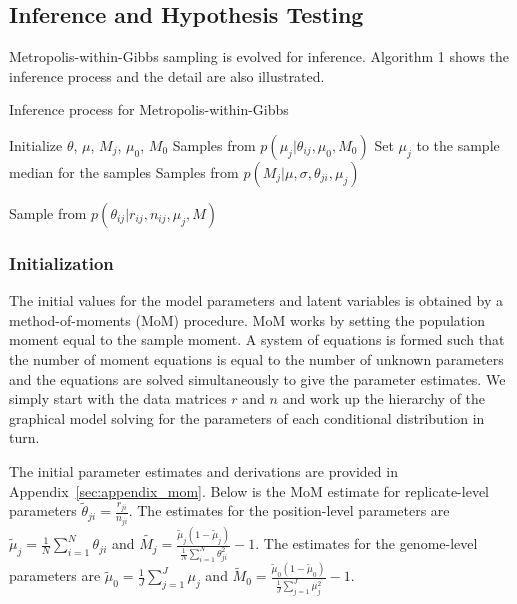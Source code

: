 \documentclass[11pt,reqno]{amsart}
\begin{document}
\subsection{Inference and Hypothesis Testing}

Metropolis-within-Gibbs sampling is evolved for inference. Algorithm 1 shows the inference process and the detail are also illustrated.

\begin{algorithm}[ht]
\caption{Inference process for Metropolis-within-Gibbs}
\label{alg:metro_gibbs}
\begin{algorithmic}[1]

\State Initialize $\theta$, $\mu$, $M_j$, $\mu_0$, $M_0$
\Repeat
{}
  \State Samples from $p \left( \mu_j |\theta_{ij},\mu_0,M_0\right)$ 
  \State Set $\mu_j$ to the sample median for the samples
  \State Samples from $p \left( M_{j} |\mu,\sigma, \theta_{ji},\mu_j\right)$ 

	\State Sample from $p \left( \theta_{ij} |r_{ij},n_{ij},\mu_j,M \right)$ 
  \EndFor

\EndFor
{}
\end{algorithmic}
\end{algorithm}

\subsubsection{Initialization}
The initial values for the model parameters and latent variables is obtained by a method-of-moments (MoM) procedure. MoM works by setting the population moment equal to the sample moment.
A system of equations is formed such that the number of moment equations is equal to the number of unknown parameters and the equations are solved simultaneously to give the parameter estimates.
We simply start with the data matrices $r$ and $n$ and work up the hierarchy of the graphical model solving for the parameters of each conditional distribution in turn.

The initial parameter estimates and derivations are provided in Appendix~\ref{sec:appendix_mom}. Below is the MoM estimate for replicate-level parameters
$\tilde{\theta}_{ji} = \frac{r_{ji}} {n_{ji}}$.
The estimates for the position-level parameters are
$\tilde{\mu}_j = \frac{1}{N} \sum_{i=1}^N \theta_{ji}$
and
$\tilde{M_j} = \frac{ \tilde{\mu}_j (1 - \tilde{\mu}_j ) } { \frac{1}{N} \sum_{i=1}^N \theta_{ji}^2 } -1$.
The estimates for the genome-level parameters are
$\tilde{\mu}_0 = \frac{1}{J} \sum_{j=1}^J \mu_j$
and
$\tilde{M}_0 = \frac{ \tilde{\mu}_0 (1 - \tilde{\mu}_0 ) } {\frac{1}{J} \sum_{j=1}^J \mu_j^2 } -1$.
\end{document}
